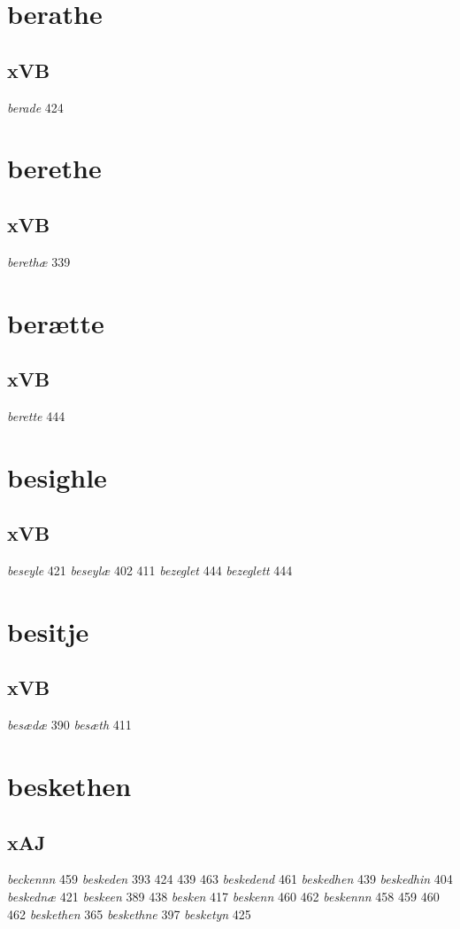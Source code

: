 \documentclass[a4paper,twocolumn]{article}
\begin{document}
\section{berathe}
\label{sec:org3af6546}
\subsection{xVB}
\label{sec:orgf91c1f0}
\emph{berade} 424 
\section{berethe}
\label{sec:org99e8da1}
\subsection{xVB}
\label{sec:org2ea065f}
\emph{berethæ} 339 
\section{berætte}
\label{sec:orgabebf3b}
\subsection{xVB}
\label{sec:org5acc111}
\emph{berette} 444 
\section{besighle}
\label{sec:org1519af9}
\subsection{xVB}
\label{sec:org0370a35}
\emph{beseyle} 421 \emph{beseylæ} 402 411 \emph{bezeglet} 444 \emph{bezeglett} 444 
\section{besitje}
\label{sec:org8416be1}
\subsection{xVB}
\label{sec:org53ed0c4}
\emph{besædæ} 390 \emph{besæth} 411 
\section{beskethen}
\label{sec:org65edac8}
\subsection{xAJ}
\label{sec:org4c631ea}
\emph{beckennn} 459 \emph{beskeden} 393 424 439 463 \emph{beskedend} 461 \emph{beskedhen} 439 \emph{beskedhin} 404 \emph{beskednæ} 421 \emph{beskeen} 389 438 \emph{besken} 417 \emph{beskenn} 460 462 \emph{beskennn} 458 459 460 462 \emph{beskethen} 365 \emph{beskethne} 397 \emph{besketyn} 425 
\end{document}

